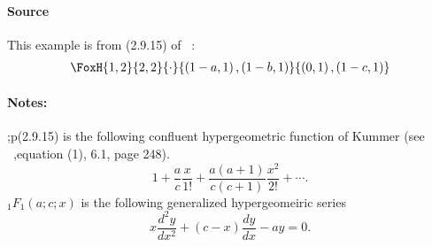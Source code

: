 \paragraph{Source} This example is from (2.9.15) of
~\cite{kilbas.saigo:04:h-transforms}:
\begin{align*}
  \FoxH
    {1,2}
    {2,2}
    {\cdot}
    {\left(1-a, 1\right), \left(1-b, 1\right)}
    {\left(0, 1\right), \left(1-c, 1\right)}
\end{align*}
\paragraph{Notes:}
;p(2.9.15) is the following confluent hypergeometric function of Kummer (see ~\cite{erdelyi.magnus.ea:81:higher*1},equation (1), 6.1, page 248).
\begin{equation}\label{kummer} 
1+ \frac{a}{c}\frac{x}{1!} + \frac{a(a+1)}{c(c+1)}\frac{x^2}{2!} + \cdots .
\end{equation}
${}_1F_1(a;c;x)$ is the following generalized hypergeomeiric series
$$ x \frac{d^2 y}{d x^2}+(c-x) \frac{d y}{d x}-a y=0.$$
